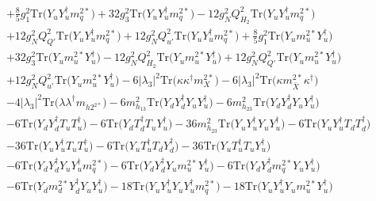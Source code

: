 {\begin{align}
 &+\frac{8}{5} g_{1}^{2} \mbox{Tr}\Big({Y_u  Y_{u}^{\dagger}  m_q^{2 *}}\Big) +32 g_{3}^{2} \mbox{Tr}\Big({Y_u  Y_{u}^{\dagger}  m_q^{2 *}}\Big) -12 g_{N}^{2} Q_{H_2}^{2} \mbox{Tr}\Big({Y_u  Y_{u}^{\dagger}  m_q^{2 *}}\Big) \nonumber \\ 
 &+12 g_{N}^{2} Q_{Q'}^{2} \mbox{Tr}\Big({Y_u  Y_{u}^{\dagger}  m_q^{2 *}}\Big) +12 g_{N}^{2} Q_{u'}^{2} \mbox{Tr}\Big({Y_u  Y_{u}^{\dagger}  m_q^{2 *}}\Big) +\frac{8}{5} g_{1}^{2} \mbox{Tr}\Big({Y_u  m_u^{2 *}  Y_{u}^{\dagger}}\Big) \nonumber \\ 
 &+32 g_{3}^{2} \mbox{Tr}\Big({Y_u  m_u^{2 *}  Y_{u}^{\dagger}}\Big) -12 g_{N}^{2} Q_{H_2}^{2} \mbox{Tr}\Big({Y_u  m_u^{2 *}  Y_{u}^{\dagger}}\Big) +12 g_{N}^{2} Q_{Q'}^{2} \mbox{Tr}\Big({Y_u  m_u^{2 *}  Y_{u}^{\dagger}}\Big) \nonumber \\ 
 &+12 g_{N}^{2} Q_{u'}^{2} \mbox{Tr}\Big({Y_u  m_u^{2 *}  Y_{u}^{\dagger}}\Big) -6 |\lambda_3|^2 \mbox{Tr}\Big({\kappa  \kappa^{\dagger}  m_{X}^{2 *}}\Big) -6 |\lambda_3|^2 \mbox{Tr}\Big({\kappa  m_{\bar{X}}^{2 *}  \kappa^{\dagger}}\Big) \nonumber \\ 
 &-4 |\lambda_3|^2 \mbox{Tr}\Big({\lambda  \lambda^{\dagger}  m_{{h 2}^{2 *}}}\Big) -6 m_{h_{13}}^2 \mbox{Tr}\Big({Y_d  Y_{d}^{\dagger}  Y_u  Y_{u}^{\dagger}}\Big) -6 m_{h_{23}}^2 \mbox{Tr}\Big({Y_d  Y_{d}^{\dagger}  Y_u  Y_{u}^{\dagger}}\Big) \nonumber \\ 
 &-6 \mbox{Tr}\Big({Y_d  Y_{d}^{\dagger}  T_u  T_{u}^{\dagger}}\Big) -6 \mbox{Tr}\Big({Y_d  T_{d}^{\dagger}  T_u  Y_{u}^{\dagger}}\Big) -36 m_{h_{23}}^2 \mbox{Tr}\Big({Y_u  Y_{u}^{\dagger}  Y_u  Y_{u}^{\dagger}}\Big) -6 \mbox{Tr}\Big({Y_u  Y_{u}^{\dagger}  T_d  T_{d}^{\dagger}}\Big) \nonumber \\ 
 &-36 \mbox{Tr}\Big({Y_u  Y_{u}^{\dagger}  T_u  T_{u}^{\dagger}}\Big) -6 \mbox{Tr}\Big({Y_u  T_{u}^{\dagger}  T_d  Y_{d}^{\dagger}}\Big) -36 \mbox{Tr}\Big({Y_u  T_{u}^{\dagger}  T_u  Y_{u}^{\dagger}}\Big) \nonumber \\ 
 &-6 \mbox{Tr}\Big({Y_d  Y_{d}^{\dagger}  Y_u  Y_{u}^{\dagger}  m_q^{2 *}}\Big) -6 \mbox{Tr}\Big({Y_d  Y_{d}^{\dagger}  Y_u  m_u^{2 *}  Y_{u}^{\dagger}}\Big) -6 \mbox{Tr}\Big({Y_d  Y_{d}^{\dagger}  m_q^{2 *}  Y_u  Y_{u}^{\dagger}}\Big) \nonumber \\ 
 &-6 \mbox{Tr}\Big({Y_d  m_d^{2 *}  Y_{d}^{\dagger}  Y_u  Y_{u}^{\dagger}}\Big) -18 \mbox{Tr}\Big({Y_u  Y_{u}^{\dagger}  Y_u  Y_{u}^{\dagger}  m_q^{2 *}}\Big) -18 \mbox{Tr}\Big({Y_u  Y_{u}^{\dagger}  Y_u  m_u^{2 *}  Y_{u}^{\dagger}}\Big) \nonumber \\ 

\end{align}}
